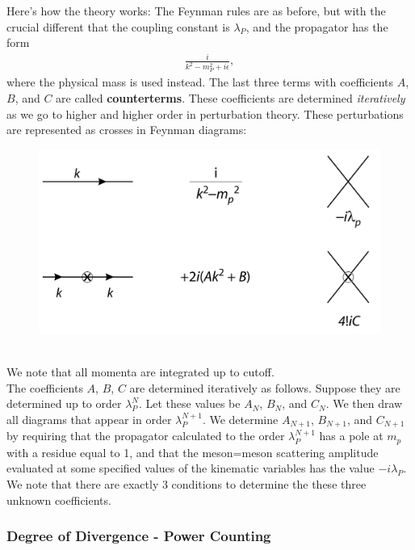 \documentclass{book}
\theoremstyle{definition}
\newcommand{\f}[2]{\frac{#1}{#2}}
\begin{document}
Here's how the theory works: The Feynman rules are as before, but with the crucial different that  the coupling constant is $\lambda_P$, and the propagator has the form
\begin{align}
\f{i}{k^2 - m_P^2 + i\epsilon},
\end{align}
where the physical mass is used instead. The last three terms with coefficients $A$, $B$, and $C$ are called \textbf{counterterms}. These coefficients are determined \textit{iteratively} as we go to higher and higher order in perturbation theory. These perturbations are represented as crosses in Feynman diagrams:
\begin{figure}[!htb]
	\centering
	\includegraphics[scale=0.2]{crosses}
\end{figure}\\

We note that all momenta are integrated up to cutoff. \\

The coefficients $A$, $B$, $C$ are determined iteratively as follows. Suppose they are determined up to order $\lambda_P^N$. Let these values be $A_N$, $B_N$, and $C_N$. We then draw all diagrams that appear in order $\lambda_P^{N+1}$. We determine $A_{N+1}$, $B_{N+1}$, and $C_{N+1}$ by requiring that the propagator calculated to the order $\lambda^{N+1}_{P}$ has a pole at $m_p$ with a residue equal to 1, and that the meson=meson scattering amplitude evaluated at some specified values of the kinematic variables has the value $-i\lambda_P$. We note that there are exactly 3 conditions to determine the these three unknown coefficients.










\subsubsection{Degree of Divergence - Power Counting}
\end{document}
